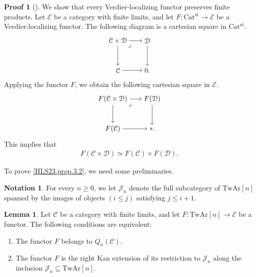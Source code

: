 \documentclass[a4paper,dvipdfmx,11pt,reqno]{amsart}
\newcommand{\C}{\mathcal{C}}
\newcommand{\D}{\mathcal{D}}
\newcommand{\E}{\mathcal{E}}
\newcommand{\J}{\mathcal{J}}
\newcommand{\Catst}{\mathrm{Cat^{st}}}
\newcommand{\TwAr}{\mathrm{TwAr}}
\theoremstyle{definition}
\newtheorem{lemma}[theorem]{Lemma}
\newtheorem{notation}[theorem]{Notation}
\newtheorem{newproof}[theorem]{Proof}
\begin{document}
\begin{newproof}[] \label{proof_of_HLS23.obs.2.2}
  We show that every Verdier-localizing functor preserves finite products.
  Let $\E$ be a category with finite limits, and let $F : \Catst \to \E$ be a Verdier-localizing functor.
  The following diagram is a cartesian square in $\Catst$.
  \[\begin{tikzpicture}[auto,->] 
    \node (tl) at (0,1.5) {$\C \times \D$}; 
    \node (tr) at (1.5,1.5) {$\D$};
    \node (bl) at (0,0) {$\C$}; 
    \node (br) at (1.5,0) {$0.$}; 
    \draw (tl) -- node {} (tr); 
    \draw (bl) -- node[swap] {} (br); 
    \draw (tl) -- node[swap] {} (bl);
    \draw (tr) -- node {} (br); 
    \node at (tl.south east) {$\lrcorner$};
  \end{tikzpicture}\]
  Applying the functor $F$, we obtain the following cartesian square in $\E$.
  \[\begin{tikzpicture}[auto,->] 
    \node (tl) at (0,1.5) {$F(\C \times \D)$}; 
    \node (tr) at (2,1.5) {$F(\D)$};
    \node (bl) at (0,0) {$F(\C)$}; 
    \node (br) at (2,0) {$\ast.$}; 
    \draw (tl) -- node {} (tr); 
    \draw (bl) -- node[swap] {} (br); 
    \draw (tl) -- node[swap] {} (bl);
    \draw (tr) -- node {} (br); 
    \node at (tl.south east) {$\lrcorner$};
  \end{tikzpicture}\]
  This implies that 
  \begin{align*}
    F(\C \times \D) \simeq F(\C) \times F(\D).
  \end{align*}
\end{newproof}

To prove \cref{HLS23.prop.3.2}, we need some preliminaries.

\begin{notation}
  For every $n \geq 0$, we let $\J_n$ denote the full subcategory of $\TwAr[n]$ spanned by the images of objects $(i \leq j)$ satisfying $j \leq i+1$.
\end{notation}

\begin{lemma} \label{Ber.lem.4.28}
  Let $\C$ be a category with finite limits, and let $F : \TwAr[n] \to \E$ be a functor.
  The following conditions are equivalent:
  \begin{enumerate}
    \item The functor $F$ belongs to $Q_n(\C)$.
    \item The functor $F$ is the right Kan extension of its restriction to $\J_n$ along the inclusion $\J_n \subseteq \TwAr[n]$.
  \end{enumerate}
\end{lemma}
\end{document}

